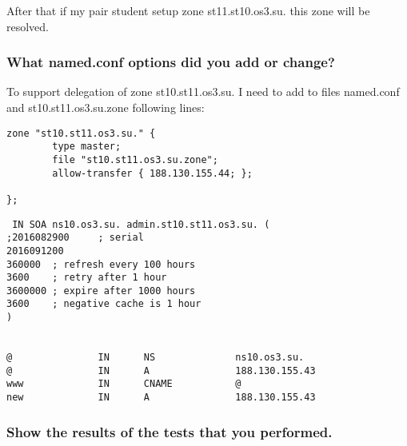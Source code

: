 \documentclass[a4paper,11pt]{article}
\begin{document}
After that if my pair student setup zone st11.st10.os3.su. this zone will be resolved.

\subsubsection{What named.conf options did you add or change?}

To support delegation of zone st10.st11.os3.su. I need to add to files named.conf and st10.st11.os3.su.zone following lines:

\begin{lstlisting}[caption=named.conf]
zone "st10.st11.os3.su." {
        type master;
        file "st10.st11.os3.su.zone";
        allow-transfer { 188.130.155.44; };

};
\end{lstlisting}

\begin{lstlisting}
 IN SOA ns10.os3.su. admin.st10.st11.os3.su. (
;2016082900     ; serial
2016091200
360000  ; refresh every 100 hours
3600    ; retry after 1 hour
3600000 ; expire after 1000 hours
3600    ; negative cache is 1 hour
)


@               IN      NS              ns10.os3.su.
@               IN      A               188.130.155.43
www             IN      CNAME           @
new             IN      A               188.130.155.43
\end{lstlisting}

\subsubsection{Show the results of the tests that you performed.}
\end{document}
